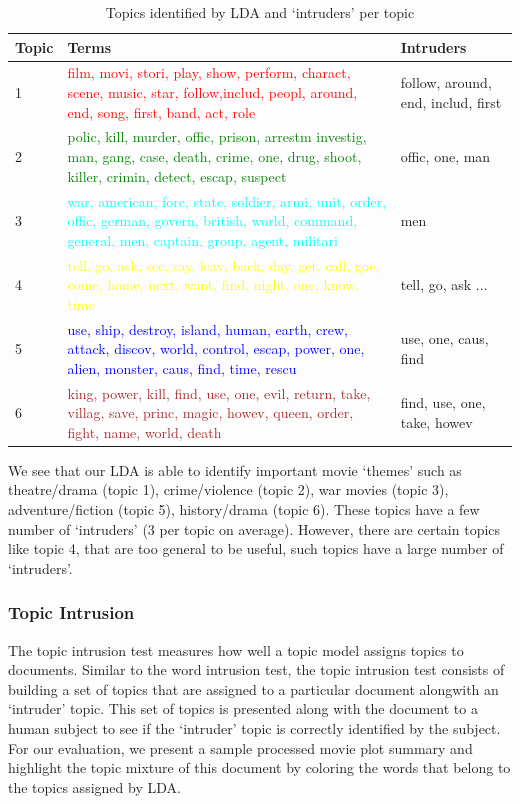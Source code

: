 \documentclass{article} %
\begin{document}
\begin{table}[h]
\label{table:word-intrusion}
\begin{center}
\begin{tabular}{l|p{3.5in}|p{1.2in}}
Topic	& Terms	& Intruders \\ \hline
1 & \textcolor{red}{film, movi, stori, play, show, perform, charact, scene, music, star, follow,includ, peopl, around, end, song, first, band, act, role} & follow, around, end, includ, first \\
2 & \textcolor{green}{polic, kill, murder, offic, prison, arrestm investig, man, gang, case, death, crime, one, drug, shoot, killer, crimin, detect, escap, suspect} & offic, one, man \\
3 & \textcolor{cyan}{war, american, forc, state, soldier, armi, unit, order, offic, german,
govern, british, world, command, general, men, captain, group, agent, militari} & men \\
4 & \textcolor{yellow}{tell, go, ask, see, say, leav, back, day, get, call, goe, come, home, next,
want, find, night, one, know, time} & tell, go, ask ... \\
5 & \textcolor{blue}{use, ship, destroy, island, human, earth, crew, attack, discov, world,
control, escap, power, one, alien, monster, caus, find, time, rescu} & use, one,
caus, find \\ 
6 & \textcolor{brown}{king, power, kill, find, use, one, evil, return, take, villag, save, princ, magic, howev, queen, order, fight, name, world, death} & find, use, one, take, howev \\ \hline 
\end{tabular}
\end{center}
\caption{Topics identified by LDA and `intruders' per topic}
\end{table}

We see that our LDA is able to identify important movie `themes' such as 
theatre/drama (topic 1), crime/violence (topic 2), war movies (topic 3), 
adventure/fiction (topic 5), history/drama (topic 6). 
These topics have a few number of `intruders' (3 per topic on average). 
However, there are certain topics like topic 4, that are too general to be 
useful, such topics have a large number of `intruders'.

\subsubsection{Topic Intrusion}
The topic intrusion test measures how well a topic model assigns topics to
documents. Similar to the word intrusion test, the topic intrusion test consists
of building a set of topics that are assigned to a particular document alongwith
an `intruder' topic. This set of topics is presented along with the document
to a human subject to see if the `intruder' topic is correctly identified by the
subject. For our evaluation, we present a sample processed movie plot summary 
and highlight the topic mixture of this document by coloring the words that 
belong to the topics assigned by LDA. 
\end{document}
